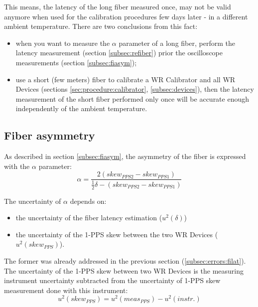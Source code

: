 This means, the latency of the long fiber measured once, may not be valid
anymore when used for the calibration procedures few days later - in a different
ambient temperature. There are two conclusions from this fact:
\begin{itemize}
  \item when you want to measure the $\alpha$ parameter of a long fiber, perform
    the latency measurement (section \ref{subsec:refiber}) prior the
    oscilloscope measurements (section \ref{subsec:fiasym});
  \item use a short (few meters) fiber to calibrate a WR Calibrator and all WR
    Devices (sections \ref{sec:procedure:calibrator}, \ref{subsec:devices}),
    then the latency measurement of the short fiber performed only once will be
    accurate enough independently of the ambient temperature.
\end{itemize}


\subsection{Fiber asymmetry}
\label{subsec:errors:fiasym}

As described in section \ref{subsec:fiasym}, the asymmetry of the fiber is
expressed with the $\alpha$ parameter:
\begin{equation}
	\alpha = \frac{2(skew_{PPS2}-skew_{PPS1})}{\frac{1}{2}\delta - (skew_{PPS2}-skew_{PPS1})}
\end{equation}

\noindent The uncertainty of $\alpha$ depends on:
\begin{itemize}
	\item the uncertainty of the fiber latency estimation ($u^2(\delta)$)
  \item the uncertainty of the 1-PPS skew between the two WR Devices ($u^2(skew_{PPS})$).
\end{itemize}
The former was already addressed in the previous section
(\ref{subsec:errors:filat}). The uncertainty of the 1-PPS skew between two WR
Devices is the measuring instrument uncertainty subtracted from the uncertainty
of 1-PPS skew measurement done with this instrument:
\begin{equation}
  \label{equ:fiasym:skewPPS}
  u^2(skew_{PPS}) = u^2(meas_{PPS}) - u^2(instr.)
\end{equation}


